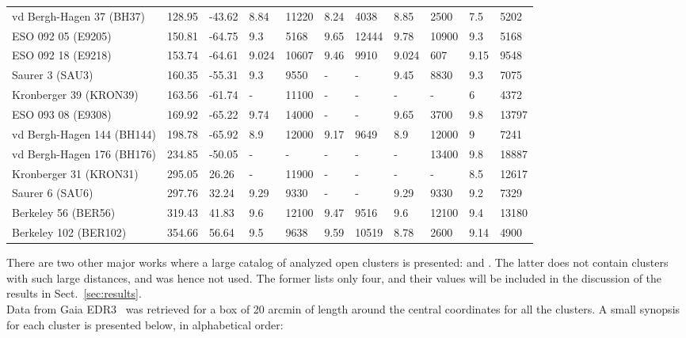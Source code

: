 \documentclass{aa}
\begin{document}
\begin{table}
\begin{tabular}{lllllllllll}
 vd Bergh-Hagen 37 (BH37)    & 128.95 & -43.62    & 8.84  & 11220 & 8.24 
 & 4038  & 8.85  & 2500  & 7.5   & 5202  \\
 ESO 092 05 (E9205)  & 150.81 & -64.75    & 9.3   & 5168  & 9.65  & 12444 &
 9.78  & 10900 & 9.3   & 5168  \\
 ESO 092 18 (E9218)  & 153.74 & -64.61    & 9.024 & 10607 & 9.46  & 9910  &
 9.024 & 607   & 9.15  & 9548  \\
 Saurer 3 (SAU3)   & 160.35 & -55.31    & 9.3   & 9550  & -   & -   & 9.45  &
 8830 & 9.3   & 7075  \\
 Kronberger 39 (KRON39)    & 163.56 & -61.74    & -   & 11100 & -   & -   & -   &
 -   & 6     & 4372  \\
 ESO 093 08 (E9308)  & 169.92 & -65.22    & 9.74  & 14000 & -   & -   & 9.65  &
 3700  & 9.8   & 13797 \\
 vd Bergh-Hagen 144 (BH144)   & 198.78 & -65.92    & 8.9   & 12000 & 9.17
 & 9649  & 8.9   & 12000 & 9     & 7241  \\
 vd Bergh-Hagen 176 (BH176)   & 234.85 & -50.05    & -   & -   & -   & - 
 & -   & 13400 & 9.8   & 18887 \\
 Kronberger 31 (KRON31)    & 295.05 & 26.26     & -   & 11900 & -   & -   & -   &
 -   & 8.5   & 12617 \\
 Saurer 6 (SAU6)   & 297.76 & 32.24     & 9.29  & 9330  & -   & -   & 9.29  &
 9330 & 9.2   & 7329  \\
 Berkeley 56 (BER56)     & 319.43 & 41.83     & 9.6   & 12100 & 9.47  & 9516  &
 9.6 & 12100 & 9.4   & 13180 \\
 Berkeley 102 (BER102)    & 354.66 & 56.64     & 9.5   & 9638  & 9.59  & 10519 &
 8.78  & 2600  & 9.14  & 4900 \\
 \hline
 \end{tabular}
 \end{table}

 There are two other major works where a large catalog of analyzed open clusters
 is presented: \cite{Lui_2019} and \cite{Dias_2021}. The latter does not contain
 clusters with such large distances, and was hence not used. The former lists
 only four, and their values will be included in the discussion of the results
 in Sect.~\ref{sec:results}.\\

 Data from Gaia EDR3~\citep{Gaia_2016,Gaia_EDR3} was retrieved for a box of 20
 arcmin of length around the central coordinates for all the clusters. A small
 synopsis for each cluster is presented below, in alphabetical order:\\
\end{document}
